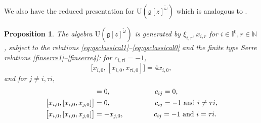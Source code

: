 \documentclass[11pt,reqno]{amsart}
\numberwithin{equation}{section}
\newtheorem{prop}[thm]{Proposition}
\theoremstyle{definition}
\theoremstyle{remark}
\newcommand{\beq}{\begin{equation}}
\newcommand{\eeq}{\end{equation}}
\newcommand{\bN}{\mathbb{N}}
\newcommand{\g}{\mathfrak{g}}
\newcommand{\rU}{{\mathrm{U}}}
\def \I{\mathbb{I}}
\begin{document}
We also have the reduced presentation for $\rU(\g[z]^{\check\omega})$ which is analogous to \cite[Prop.~2.8]{KLWZ23b}.
\begin{prop}\label{prop:redu}
The algebra $\mathrm U(\g[z]^{\check\omega})$ is generated by $\xi_{i,r},x_{i,r}$ for $i\in \I^0,r\in\bN$, subject to the relations \eqref{eq:qsclassical1}--\eqref{eq:qsclassical0} and the finite type Serre relations \eqref{finserre1}--\eqref{finserre4}: for $c_{i,\tau i}=-1$,
\beq\label{finserre1}
\big[x_{i,0},[x_{i,0},x_{\tau i,0}]\big]  
= 4x_{i,0},
\eeq
and for $j\neq i,\tau i,$
\begin{align}
[x_{i,0},x_{j,0}]&=0,\hskip 2.2cm c_{ij}=0,\label{finserre2}
\\
\big[x_{i,0},[x_{i,0},x_{j,0}]\big]& =0,\hskip 2.2cm c_{ij}=-1 \text{ and }i\ne \tau i, \label{finserre3}\\
\big[x_{i,0},[x_{i,0},x_{j,0}]\big]& =-x_{j,0},\hskip 1.5cm c_{ij}=-1 \text{ and }i=\tau i.\label{finserre4}
\end{align}
\end{prop}
\end{document}
